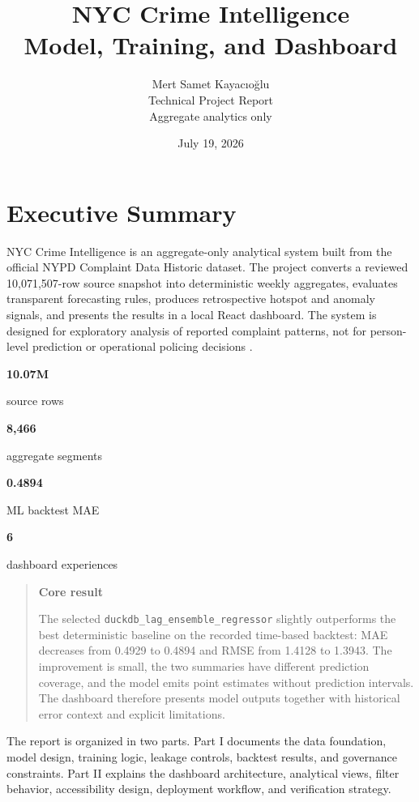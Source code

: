 \documentclass[11pt,oneside]{report}
\title{NYC Crime Intelligence\\[0.75em]
  \large Model, Training, and Dashboard}
\author{Mert Samet Kayacıoğlu\\[0.5em]
  \small Technical Project Report\\
  \small Aggregate analytics only}
\date{July 19, 2026}
\newenvironment{summarybox}[1][]
  {\begin{quote}\small\noindent\textbf{#1}\par\smallskip}
  {\end{quote}}
\newcommand{\metric}[2]{%
  \begin{minipage}[t]{0.23\textwidth}
    \centering
    {\bfseries\large #1}\par
    {\small #2}
  \end{minipage}%
}
\begin{document}
\maketitle


\chapter*{Executive Summary}

NYC Crime Intelligence is an aggregate-only analytical system built from the
official NYPD Complaint Data Historic dataset. The project converts a reviewed
10,071,507-row source snapshot into deterministic weekly aggregates, evaluates
transparent forecasting rules, produces retrospective hotspot and anomaly
signals, and presents the results in a local React dashboard. The system is
designed for exploratory analysis of reported complaint patterns, not for
person-level prediction or operational policing decisions \cite{finalreport,rootreadme}.

\begin{center}
  \metric{10.07M}{source rows}\hfill
  \metric{8,466}{aggregate segments}\hfill
  \metric{0.4894}{ML backtest MAE}\hfill
  \metric{6}{dashboard experiences}
\end{center}

\begin{summarybox}[Core result]
The selected \texttt{duckdb\_lag\_ensemble\_regressor} slightly outperforms the
best deterministic baseline on the recorded time-based backtest: MAE decreases
from 0.4929 to 0.4894 and RMSE from 1.4128 to 1.3943. The improvement is small,
the two summaries have different prediction coverage, and the model emits point
estimates without prediction intervals. The dashboard therefore presents model
outputs together with historical error context and explicit limitations.
\end{summarybox}

The report is organized in two parts. Part I documents the data foundation,
model design, training logic, leakage controls, backtest results, and governance
constraints. Part II explains the dashboard architecture, analytical views,
filter behavior, accessibility design, deployment workflow, and verification
strategy.

\tableofcontents
\clearpage

\end{document}
